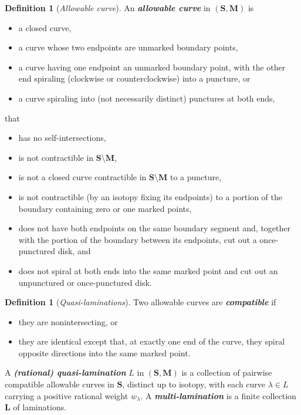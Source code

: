 \documentclass{amsart}
\theoremstyle{definition}
\newtheorem{definition}[proposition]{Definition}
\theoremstyle{remark}
\numberwithin{equation}{section}
\newcommand{\newword}[1]{\textbf{\emph{#1}}}
\newcommand{\0}{{\mathbf{0}}}
\newcommand{\M}{\mathbf{M}}
\renewcommand{\L}{\mathbf{L}}
\renewcommand{\S}{\mathbf{S}}
\begin{document}
\begin{definition}[\emph{Allowable curve}]\label{allowable def}
An \newword{allowable curve} in $(\S,\M)$ is  
\begin{itemize}
\item a closed curve,
\item a curve whose two endpoints are unmarked boundary points,
\item a curve having one endpoint an unmarked boundary point, with the other end spiraling (clockwise or counterclockwise) into a puncture, or
\item a curve spiraling into (not necessarily distinct) punctures at both ends,
\end{itemize}
that
\begin{itemize}
\item has no self-intersections,
\item is not contractible in $\S\setminus\M$,
\item is not a closed curve contractible in $\S\setminus\M$ to a puncture,
\item is not contractible (by an isotopy fixing its endpoints) to a portion of the boundary containing zero or one marked points,
\item does not have both endpoints on the same boundary segment and, together with the portion of the boundary between its endpoints, cut out a once-punctured disk, and 
\item does not spiral at both ends into the same marked point and cut out an unpunctured or once-punctured disk.
\end{itemize}
\end{definition}


\begin{definition}[\emph{Quasi-laminations}]\label{quasilam def}
Two allowable curves are \newword{compatible} if 
\begin{itemize}
\item
they are nonintersecting, or 
\item they are identical except that, at exactly one end of the curve, they spiral opposite directions into the same marked point.
\end{itemize}
A \newword{(rational) quasi-lamination} $L$ in $(\S,\M)$ is a collection of pairwise compatible allowable curves in $\S$, distinct up to isotopy, with each curve $\lambda\in L$ carrying a positive rational weight $w_\lambda$.
A \newword{multi-lamination} is a finite collection $\L$ of laminations.
\end{definition}
\end{document}
